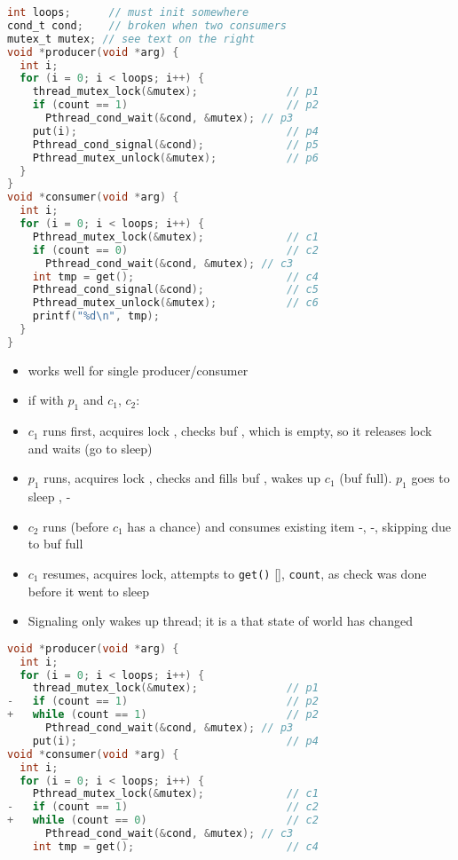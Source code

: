 \begin{minipage}{.63\linewidth}
\begin{lstlisting}[language=c,xleftmargin=0pt]
int loops;      // must init somewhere
cond_t cond;    // broken when two consumers
mutex_t mutex; // see text on the right
void *producer(void *arg) {
  int i;
  for (i = 0; i < loops; i++) {
    thread_mutex_lock(&mutex);              // p1
    if (count == 1)                         // p2
      Pthread_cond_wait(&cond, &mutex); // p3
    put(i);                                 // p4
    Pthread_cond_signal(&cond);             // p5
    Pthread_mutex_unlock(&mutex);           // p6
  }
}
void *consumer(void *arg) {
  int i;
  for (i = 0; i < loops; i++) {
    Pthread_mutex_lock(&mutex);             // c1
    if (count == 0)                         // c2
      Pthread_cond_wait(&cond, &mutex); // c3
    int tmp = get();                        // c4
    Pthread_cond_signal(&cond);             // c5
    Pthread_mutex_unlock(&mutex);           // c6
    printf("%d\n", tmp);
  }
}
\end{lstlisting}
\end{minipage}
\begin{minipage}{.4\linewidth}
  \flushleft
  \begin{itemize}
  \item works well  for single producer/consumer
  \item if with $p_1$ and $c_1$, $c_2$:
  \item $c_1$ runs first, acquires lock , checks buf , which is empty, so it releases lock and waits  (go to sleep)
  \item $p_1$ runs, acquires lock , checks  and fills buf , wakes up $c_1$  (buf full). $p_1$ goes to sleep , -
  \item $c_2$ runs (before $c_1$ has a chance) and consumes existing item -, -, skipping  due to buf full
  \item $c_1$ resumes, acquires lock, attempts to \texttt{get()} [],  \texttt{count}, as check was done before it went to sleep 
  \item Signaling only wakes up thread; it is a  that state
of world has changed
  \end{itemize}
\end{minipage}
\begin{minipage}{.64\linewidth}
\begin{lstlisting}[language=c,xleftmargin=0pt]
void *producer(void *arg) {
  int i;
  for (i = 0; i < loops; i++) {
    thread_mutex_lock(&mutex);              // p1
-   if (count == 1)                         // p2
+   while (count == 1)                      // p2
      Pthread_cond_wait(&cond, &mutex); // p3
    put(i);                                 // p4
void *consumer(void *arg) {
  int i;
  for (i = 0; i < loops; i++) {
    Pthread_mutex_lock(&mutex);             // c1
-   if (count == 1)                         // c2
+   while (count == 0)                      // c2
      Pthread_cond_wait(&cond, &mutex); // c3
    int tmp = get();                        // c4
\end{lstlisting}
\end{minipage}
